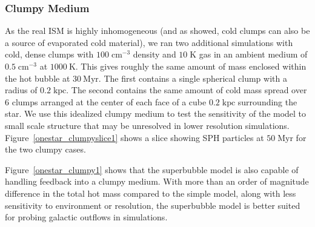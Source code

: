 \subsubsection{Clumpy Medium}\label{clumpy1}
As the real ISM is highly inhomogeneous (and as \citet{Silich1996} showed, cold
clumps can also be a source of evaporated cold material), we ran two additional
simulations with cold, dense clumps with $100\;\mathrm{cm^{-3}}$ density and
$10\;\mathrm{K}$ gas in an ambient medium of $0.5\;\mathrm{cm^{-3}}$ at
$1000\:\mathrm{K}$.  This gives roughly the same amount of mass enclosed within
the hot bubble at $30\:\mathrm{Myr}$.  The first contains a single spherical
clump with a radius of $0.2\;\mathrm{kpc}$.  The second contains the same amount
of cold mass spread over 6 clumps arranged at the center of each face of a cube
$0.2\;\mathrm{kpc}$ surrounding the star.  We use this idealized clumpy medium
to test the sensitivity of the model to small scale structure that may be
unresolved in lower resolution simulations. Figure~\ref{onestar_clumpyslice1}
shows a slice showing SPH particles at $50\;\mathrm{Myr}$ for the two clumpy
cases.  

Figure~\ref{onestar_clumpy1} shows that the superbubble model is also capable of
handling feedback into a clumpy medium.  With more than an order of magnitude
difference in the total hot mass compared to the simple model, along with less
sensitivity to environment or resolution, the superbubble model is better
suited for probing galactic outflows in simulations.  


